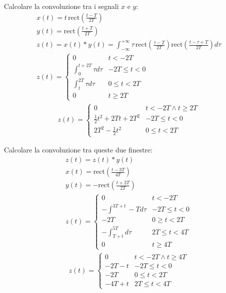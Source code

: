 \documentclass{article}
\begin{document}
Calcolare la convoluzione tra i segnali $x$ e $y$:
\begin{gather*}
    x(t)=\displaystyle t\,\mbox{rect}\left(\frac{t-T}{2T}\right)\\
    y(t)=\displaystyle\mbox{rect}\left(\frac{t+T}{2T}\right)\\
    z(t)=x(t)*y(t)=\displaystyle\int_{-\infty}^{+\infty}\tau\,\mbox{rect}\left(\frac{\tau-T}{2T}\right)\mbox{rect}\left(\frac{t-\tau+T}{2T}\right)d\tau\\
    z(t)=\begin{cases}
        0&t<-2T\\
        \displaystyle\int_{0}^{t+2T}\tau d\tau&-2T\leq t<0\\
        \displaystyle\int_{t}^{2T}\tau d\tau&0\leq t<2T\\
        0&t\geq2T
    \end{cases}
\end{gather*}
\begin{gather}
    z(t)=\begin{cases}
        0&t<-2T\land t\geq2T\\
        \displaystyle\frac{1}{2}t^2+2Tt+2T^2&-2T\leq t<0\\
        \displaystyle2T^2-\frac{1}{2}t^2&0\leq t<2T
    \end{cases}
\end{gather}


Calcolare la convoluzione tra queste due finestre:
\begin{gather*}
    z(t)=z(t)*y(t)\\
    x(t)=\displaystyle\mbox{rect}\left(\frac{t-3T}{4T}\right)\\
    y(t)=-\displaystyle\mbox{rect}\left(\frac{t+2T}{2T}\right)\\
    z(t)=\begin{cases}
        0&t<-2T\\
        -\displaystyle\int^{3T+t}-{T}d\tau&-2T\leq t<0\\
        -2T&0\geq t<2T\\
        -\displaystyle\int_{T+t}^{5T}d\tau&2T\leq t<4T\\
        0&t\geq 4T
    \end{cases}
\end{gather*}
\begin{gather}
    z(t)=\begin{cases}
        0&t<-2T \land t\geq 4T\\
        -2T-t&-2T\leq t<0\\
        -2T&0\leq t<2T\\
        -4T+t&2T\leq t<4T
    \end{cases}
\end{gather}
\end{document}
